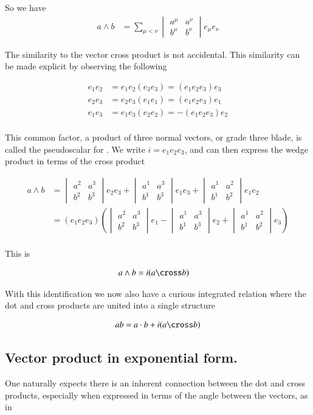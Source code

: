 \documentclass{article}
\newcommand{\uDETuvij}[4]{
\begin{vmatrix}
 {#1}^{#3} & {#1}^{#4} \\
 {#2}^{#3} & {#2}^{#4}
\end{vmatrix}
}
\begin{document}
So we have
\begin{align}
a \wedge b
&= \sum_{\mu < \nu} \uDETuvij{a}{b}{\mu}{\nu} e_\mu e_\nu 
\end{align}

The similarity to the  vector cross product is not accidental.  This similarity can be made explicit by observing the following

\begin{align*}
e_1 e_2 &= e_1 e_2 (e_3 e_3) = (e_1 e_2 e_3) e_3 \\
e_2 e_3 &= e_2 e_3 (e_1 e_1) = (e_1 e_2 e_3) e_1 \\
e_1 e_3 &= e_1 e_3 (e_2 e_2) = -(e_1 e_2 e_3) e_2 \\
\end{align*}

This common factor, a product of three normal vectors, or grade three blade, is called the pseudoscalar for .  We write
$i = e_1 e_2 e_3$, and can then express the  wedge product in terms of the cross product

\begin{align*}
a \wedge b
&= 
\uDETuvij{a}{b}{2}{3} e_2 e_3 
+\uDETuvij{a}{b}{1}{3} e_1 e_3 
+\uDETuvij{a}{b}{1}{2} e_1 e_2  \\
&= 
(e_1 e_2 e_3) \left( \uDETuvij{a}{b}{2}{3} e_1 
-\uDETuvij{a}{b}{1}{3} e_2 
+\uDETuvij{a}{b}{1}{2} e_3 \right) \\
\end{align*}

This is

\begin{align}\label{eqn:wedgeAsCross}
a \wedge b &= i (a \cross b)
\end{align}

With this identification we now also have a curious integrated relation where the dot and cross products are united into
a single structure

\begin{align}\label{eqn:scalarPlusIcross}
a b = a \cdot b + i (a \cross b)
\end{align}

\subsection{ Vector product in exponential form. }

One naturally expects there is an inherent connection between the dot and cross products, especially when expressed in terms of
the angle between the vectors, as in
\end{document}
